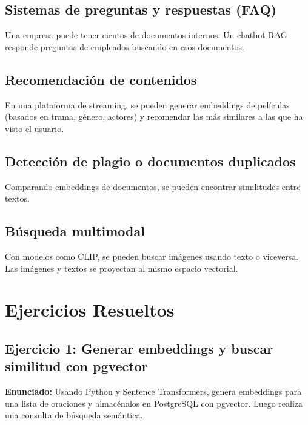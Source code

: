 \documentclass[12pt,a4paper,openany,oneside]{book}
\begin{document}
\section{Sistemas de preguntas y respuestas (FAQ)}
Una empresa puede tener cientos de documentos internos. Un chatbot RAG responde preguntas de empleados buscando en esos documentos.

\section{Recomendación de contenidos}
En una plataforma de streaming, se pueden generar embeddings de películas (basados en trama, género, actores) y recomendar las más similares a las que ha visto el usuario.

\section{Detección de plagio o documentos duplicados}
Comparando embeddings de documentos, se pueden encontrar similitudes entre textos.

\section{Búsqueda multimodal}
Con modelos como CLIP, se pueden buscar imágenes usando texto o viceversa. Las imágenes y textos se proyectan al mismo espacio vectorial.

\chapter{Ejercicios Resueltos}
\section{Ejercicio 1: Generar embeddings y buscar similitud con pgvector}
\textbf{Enunciado:} Usando Python y Sentence Transformers, genera embeddings para una lista de oraciones y almacénalos en PostgreSQL con pgvector. Luego realiza una consulta de búsqueda semántica.
\end{document}
